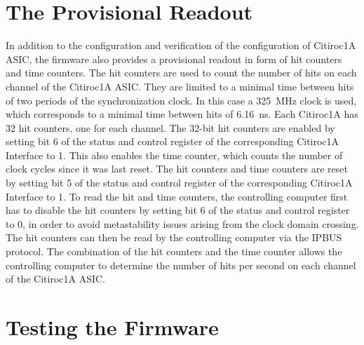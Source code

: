 \section{The Provisional Readout}
In addition to the configuration and verification of the configuration of Citiroc1A ASIC, the firmware also provides a provisional readout in form of hit counters and time counters. 
\newline
The hit counters are used to count the number of hits on each channel of the Citiroc1A ASIC.
\newline
They are limited to a minimal time between hits of two periods of the synchronization clock.
In this case a \SI{325}{\mega\hertz} clock is used, which corresponds to a minimal time between hits of \SI{6.16}{\nano\second}.
\newline
Each Citiroc1A has 32 hit counters, one for each channel.
The 32-bit hit counters are enabled by setting bit 6 of the status and control register of the corresponding Citiroc1A Interface to 1. 
This also enables the time counter, which counts the number of clock cycles since it was last reset. 
\newline
The hit counters and time counters are reset by setting bit 5 of the status and control register of the corresponding Citiroc1A Interface to 1.
\newline
To read the hit and time counters, the controlling computer first has to disable the hit counters by setting bit 6 of the status and control register to 0, in order to avoid metastability issues arising from the clock domain crossing.
The hit counters can then be read by the controlling computer via the IPBUS protocol.
\newline
The combination of the hit counters and the time counter allows the controlling computer to determine the number of hits per second on each channel of the Citiroc1A ASIC. 


\section{Testing the Firmware}
